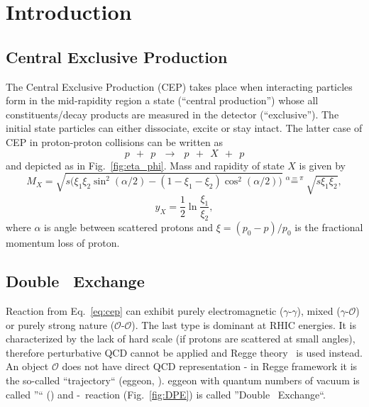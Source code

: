 

\chapter{Introduction}\label{chap:introduction}
\section{Central Exclusive Production}
The Central Exclusive Production (CEP) takes place when interacting particles form in the mid-rapidity region a state (``central production'') whose all constituents/decay products are measured in the detector (``exclusive''). The initial state particles can either dissociate, excite or stay intact. The latter case of CEP in proton-proton collisions can be written as
\begin{equation}\label{eq:cep}%
p~~+~~p~~~\rightarrow~~~p~~+~~X~~+~~p
\end{equation}
and depicted as in Fig.~\ref{fig:eta_phi}. Mass and rapidity of state $X$ is given by
\begin{equation}\label{eq:mass_X}
M_{X} = \sqrt{s\Big(\xi_{1}\xi_{2}\sin^{2}{(\alpha/2)}-(1-\xi_{1}-\xi_{2})\cos^{2}{(\alpha/2)}\Big)} \stackrel{\alpha=\pi}{=} \sqrt{s\xi_{1}\xi_{2}},
\end{equation}\vspace{-10pt}
\begin{equation}\label{eq:rapidity_X}
y_{X} = \frac{1}{2}\ln{\frac{\xi_{1}}{\xi_{2}}},
\end{equation}
where $\alpha$ is angle between scattered protons and $\xi=(p_{0}-p)/p_{0}$ is the fractional momentum loss of proton.

\section{Double \Pomeron\  Exchange}
Reaction from Eq.~\ref{eq:cep} can exhibit purely electromagnetic ($\gamma$-$\gamma$), mixed ($\gamma$-$\mathcal{O}$) or purely strong nature ($\mathcal{O}$-$\mathcal{O}$). The last type is dominant at RHIC energies. It is characterized by the lack of hard scale (if protons are scattered at small angles), therefore perturbative QCD cannot be applied and Regge theory~\cite{IntroductionToRegge} is used instead. An object $\mathcal{O}$ does not have direct QCD representation - in Regge framework it is the so-called ``trajectory`` (\Reg eggeon, \Reg). \Reg eggeon with quantum numbers of vacuum is called ''\Pomeron`` (\Pom) and \Pom-\Pom\ reaction (Fig.~\ref{fig:DPE}) is called ''Double \Pomeron\  Exchange``. %

